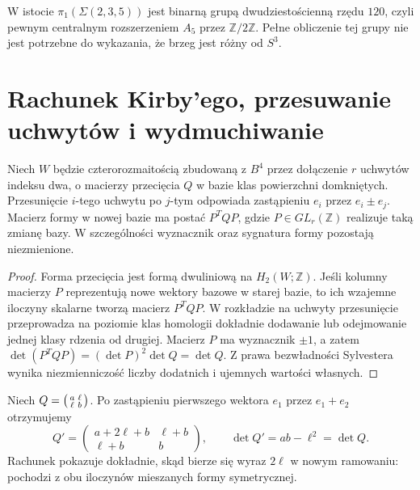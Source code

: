 \begin{uwaga}
W istocie $\pi_1(\Sigma(2,3,5))$ jest binarną grupą
dwudziestościenną rzędu $120$, czyli pewnym centralnym
rozszerzeniem $A_5$ przez $\mathbb Z/2\mathbb Z$.
Pełne obliczenie tej grupy nie jest potrzebne do
wykazania, że brzeg jest różny od $S^3$.
\end{uwaga}

\section{Rachunek Kirby'ego, przesuwanie uchwytów i wydmuchiwanie}
\label{sec:tg-plumbing-kirby}

\begin{stwierdzenie}
Niech $W$ będzie czterorozmaitością zbudowaną z $B^4$
przez dołączenie $r$ uchwytów indeksu dwa, o macierzy
przecięcia $Q$ w bazie klas powierzchni domkniętych.
Przesunięcie $i$-tego uchwytu po $j$-tym odpowiada
zastąpieniu $e_i$ przez $e_i\pm e_j$. Macierz formy
w nowej bazie ma postać $P^TQP$, gdzie
$P\in GL_r(\mathbb Z)$ realizuje taką zmianę bazy.
W szczególności wyznacznik oraz sygnatura formy
pozostają niezmienione.
\end{stwierdzenie}
\begin{proof}
Forma przecięcia jest formą dwuliniową na
$H_2(W;\mathbb Z)$. Jeśli kolumny macierzy $P$
reprezentują nowe wektory bazowe w starej bazie,
to ich wzajemne iloczyny skalarne tworzą macierz
$P^TQP$. W rozkładzie na uchwyty przesunięcie
przeprowadza na poziomie klas homologii dokładnie dodawanie lub
odejmowanie jednej klasy rdzenia od drugiej.
Macierz $P$ ma wyznacznik $\pm1$, a zatem
$\det(P^TQP)=(\det P)^2\det Q=\det Q$.
Z prawa bezwładności Sylvestera wynika niezmienniczość
liczby dodatnich i ujemnych wartości własnych.
\end{proof}

\begin{przyklad}
Niech $Q=\begin{psmallmatrix}a&\ell\\\ell&b\end{psmallmatrix}$.
Po zastąpieniu pierwszego wektora $e_1$ przez
$e_1+e_2$ otrzymujemy
\[
Q'=\begin{pmatrix}a+2\ell+b&\ell+b\\\ell+b&b\end{pmatrix},
\qquad \det Q'=ab-\ell^2=\det Q.
\]
Rachunek pokazuje dokładnie, skąd bierze się wyraz
$2\ell$ w nowym ramowaniu: pochodzi z obu iloczynów
mieszanych formy symetrycznej.
\end{przyklad}

